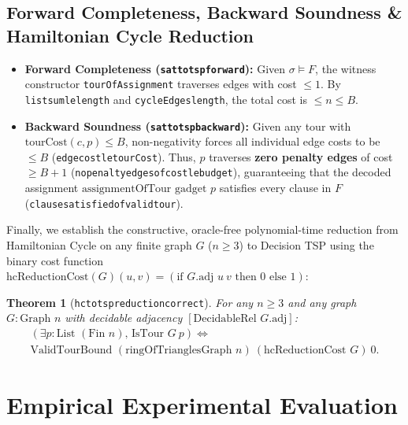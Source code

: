 \documentclass[11pt,a4paper]{article}
\renewcommand{\_}{\origunderscore\allowbreak}
\theoremstyle{plain}
\newtheorem{theorem}{Theorem}[section]
\theoremstyle{definition}
\theoremstyle{remark}
\begin{document}
\subsection{Forward Completeness, Backward Soundness \& Hamiltonian Cycle Reduction}
\begin{itemize}
  \item \textbf{Forward Completeness (\texttt{sat\_to\_tsp\_forward}):} Given $\sigma \models F$, the witness constructor \texttt{tourOfAssignment} traverses edges with cost $\le 1$. By \texttt{list\_sum\_le\_length} and \texttt{cycleEdges\_length}, the total cost is $\le n \le B$.
  \item \textbf{Backward Soundness (\texttt{sat\_to\_tsp\_backward}):} Given any tour with $\text{tourCost}(c, p) \le B$, non-negativity forces all individual edge costs to be $\le B$ (\texttt{edge\_cost\_le\_tourCost}). Thus, $p$ traverses \textbf{zero penalty edges} of cost $\ge B + 1$ (\texttt{no\_penalty\_edges\_of\_cost\_le\_budget}), guaranteeing that the decoded assignment $\text{assignmentOfTour gadget } p$ satisfies every clause in $F$ (\texttt{clause\_satisfied\_of\_valid\_tour}).
\end{itemize}
Finally, we establish the constructive, oracle-free polynomial-time reduction from Hamiltonian Cycle on any finite graph $G$ ($n \ge 3$) to Decision TSP using the binary cost function $\text{hcReductionCost}(G)(u, v) = (\text{if } G.\text{adj } u\ v \text{ then } 0 \text{ else } 1)$:
\begin{theorem}[\texttt{hc\_to\_tsp\_reduction\_correct}]
For any $n \ge 3$ and any graph $G : \text{Graph } n$ with decidable adjacency $[\text{DecidableRel } G.\text{adj}]$:
\begin{equation*}
\begin{aligned}
  (\exists p : \text{List } (\text{Fin } n),\, \text{IsTour } G\ p) \iff \\
  \text{ValidTourBound } (\text{ringOfTrianglesGraph } n)\ (\text{hcReductionCost } G)\ 0.
\end{aligned}
\end{equation*}
\end{theorem}

\section{Empirical Experimental Evaluation}
\end{document}
